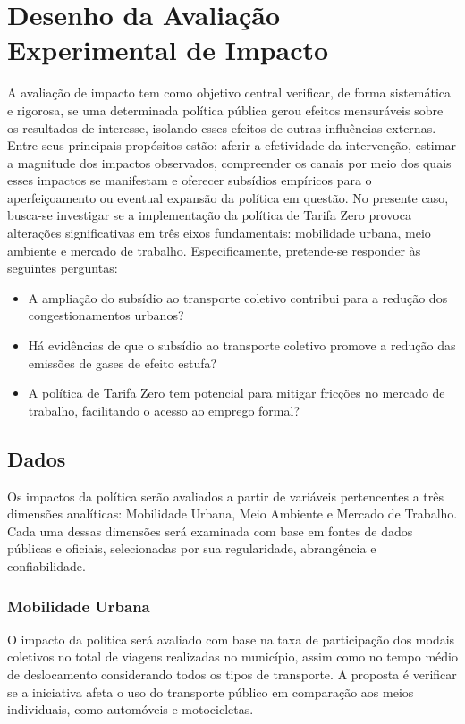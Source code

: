 
\section{Desenho da Avaliação Experimental de Impacto}
A avaliação de impacto tem como objetivo central verificar, de forma sistemática e rigorosa, se uma determinada política pública gerou efeitos mensuráveis sobre os resultados de interesse, isolando esses efeitos de outras influências externas. Entre seus principais propósitos estão: aferir a efetividade da intervenção, estimar a magnitude dos impactos observados, compreender os canais por meio dos quais esses impactos se manifestam e oferecer subsídios empíricos para o aperfeiçoamento ou eventual expansão da política em questão. No presente caso, busca-se investigar se a implementação da política de Tarifa Zero provoca alterações significativas em três eixos fundamentais: mobilidade urbana, meio ambiente e mercado de trabalho. Especificamente, pretende-se responder às seguintes perguntas:

\begin{itemize} 
    \item A ampliação do subsídio ao transporte coletivo contribui para a redução dos congestionamentos urbanos? 
    \item Há evidências de que o subsídio ao transporte coletivo promove a redução das emissões de gases de efeito estufa? 
    \item A política de Tarifa Zero tem potencial para mitigar fricções no mercado de trabalho, facilitando o acesso ao emprego formal? 
\end{itemize}

\subsection{Dados}

Os impactos da política serão avaliados a partir de variáveis pertencentes a três dimensões analíticas: Mobilidade Urbana, Meio Ambiente e Mercado de Trabalho. Cada uma dessas dimensões será examinada com base em fontes de dados públicas e oficiais, selecionadas por sua regularidade, abrangência e confiabilidade.

\subsubsection{Mobilidade Urbana}
O impacto da política será avaliado com base na taxa de participação dos modais coletivos no total de viagens realizadas no município, assim como no tempo médio de deslocamento considerando todos os tipos de transporte. A proposta é verificar se a iniciativa afeta o uso do transporte público em comparação aos meios individuais, como automóveis e motocicletas.

